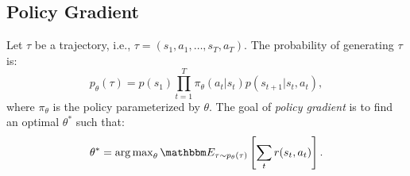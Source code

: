 


    
\subsection{Policy Gradient}
Let $\tau$ be a trajectory, i.e., $\tau = (s_1, a_1, \ldots, s_T, a_T)$.
The probability of generating $\tau$ is:
    \begin{equation}
        p_{\theta}(\tau) = p(s_1) \prod_{t=1}^{T}{\pi_{\theta}(a_t | s_t) p(s_{t+1} | s_t, a_t)},
    \end{equation}
where $\pi_{\theta}$ is the policy parameterized by $\theta$.
The goal of \emph{policy gradient} is to find an optimal $\theta^\ast$ such that:
    \begin{equation}
        \theta^\ast = \argmax_{\theta} \E_{\tau \sim p_\theta(\tau)}\left[ \sum_{t}^{}{r(s_t, a_t)} \right].
    \end{equation}
    
